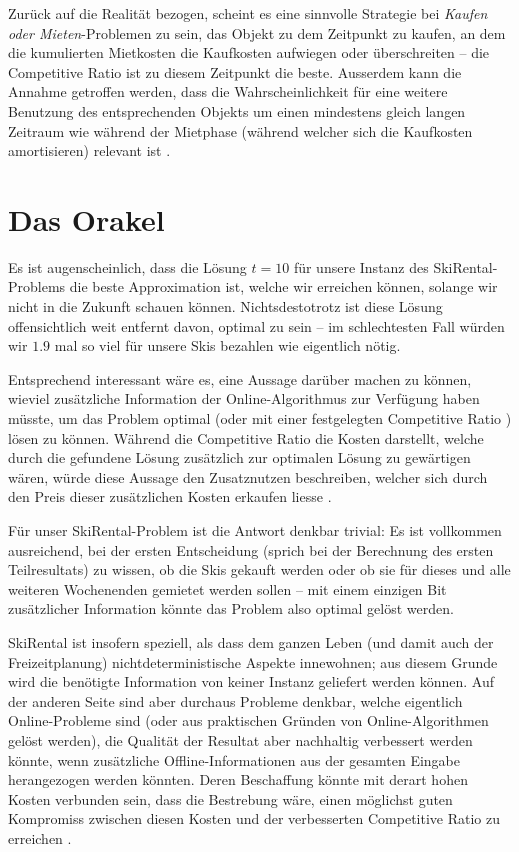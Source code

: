 \documentclass[11pt,abstracton]{scrreprt} %
\theoremstyle{definition}
\begin{document}
\bigskip
Zurück auf die Realität bezogen, scheint es eine sinnvolle Strategie bei {\sl Kaufen oder Mieten}-Problemen zu sein, das Objekt zu dem Zeitpunkt zu kaufen, an dem die kumulierten Mietkosten die Kaufkosten aufwiegen oder überschreiten -- die Competitive Ratio ist zu diesem Zeitpunkt die beste. Ausserdem kann die Annahme getroffen werden, dass die Wahrscheinlichkeit für eine weitere Benutzung des entsprechenden Objekts um einen mindestens gleich langen Zeitraum wie während der Mietphase (während welcher sich die Kaufkosten amortisieren) relevant ist \cite{Trevisan}.


\section{Das Orakel}

Es ist augenscheinlich, dass die Lösung $t = 10$ für unsere Instanz des {\sc SkiRental}-Problems die beste Approximation ist, welche wir erreichen können, solange wir nicht in die Zukunft schauen können. Nichtsdestotrotz ist diese Lösung offensichtlich weit entfernt davon, optimal zu sein -- im schlechtesten Fall würden wir $1.9$ mal so viel für unsere Skis bezahlen wie eigentlich nötig.

\bigskip
Entsprechend interessant wäre es, eine Aussage darüber machen zu können, wieviel zusätzliche Information der Online-Algorithmus zur Verfügung haben müsste, um das Problem optimal (oder mit einer festgelegten Competitive Ratio \cite{BKK}) lösen zu können. Während die Competitive Ratio die Kosten darstellt, welche durch die gefundene Lösung zusätzlich zur optimalen Lösung zu gewärtigen wären, würde diese Aussage den Zusatznutzen beschreiben, welcher sich durch den Preis dieser zusätzlichen Kosten erkaufen liesse \cite{Dobrev}.

\bigskip
Für unser {\sc SkiRental}-Problem ist die Antwort denkbar trivial: Es ist vollkommen ausreichend, bei der ersten Entscheidung (sprich bei der Berechnung des ersten Teilresultats) zu wissen, ob die Skis gekauft werden  oder ob sie für dieses und alle weiteren Wochenenden gemietet werden sollen -- mit einem einzigen Bit zusätzlicher Information könnte das Problem also optimal gelöst werden.

\bigskip
{\sc SkiRental} ist insofern speziell, als dass dem ganzen Leben (und damit auch der Freizeitplanung) nichtdeterministische Aspekte innewohnen; aus diesem Grunde wird die benötigte Information von keiner Instanz geliefert werden können. Auf der anderen Seite sind aber durchaus Probleme denkbar, welche eigentlich Online-Probleme sind (oder aus praktischen Gründen von Online-Algorithmen gelöst werden), die Qualität der Resultat aber nachhaltig verbessert werden könnte, wenn zusätzliche Offline-Informationen aus der gesamten Eingabe herangezogen werden könnten. Deren Beschaffung könnte mit derart hohen Kosten verbunden sein, dass die Bestrebung wäre, einen möglichst guten Kompromiss zwischen diesen Kosten und der verbesserten Competitive Ratio zu erreichen \cite{Dobrev}.
\end{document}
